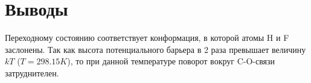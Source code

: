\section{Выводы}
Переходному состоянию соответствует конформация, в которой атомы H и F заслонены. Так как высота потенциального барьера в 2 раза превышает величину $kT$ ($T = 298.15K$), то при данной температуре поворот вокруг C-O-связи затруднителен.
